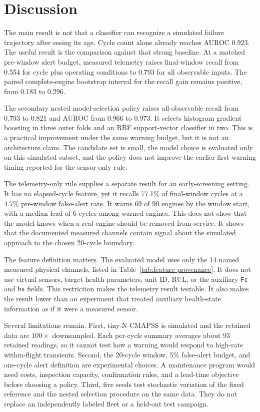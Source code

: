 \section{Discussion}
\label{sec:discussion}

The main result is not that a classifier can recognize a simulated failure
trajectory after seeing its age. Cycle count alone already reaches AUROC 0.923.
The useful result is the comparison against that strong baseline. At a matched
pre-window alert budget, measured telemetry raises final-window recall from
0.554 for cycle plus operating conditions to 0.793 for all observable inputs.
The paired complete-engine bootstrap interval for the recall gain remains
positive, from 0.183 to 0.296.

The secondary nested model-selection policy raises all-observable recall from
0.793 to 0.821 and AUROC from 0.966 to 0.973. It selects histogram gradient
boosting in three outer folds and an RBF support-vector classifier in two. This
is a practical improvement under the same warning budget, but it is not an
architecture claim. The candidate set is small, the model choice is evaluated
only on this simulated subset, and the policy does not improve the earlier
first-warning timing reported for the sensor-only rule.

The telemetry-only rule supplies a separate result for an early-screening
setting. It has no elapsed-cycle feature, yet it recalls 77.1\% of final-window
cycles at a 4.7\% pre-window false-alert rate. It warns 69 of 90 engines by
the window start, with a median lead of 6 cycles among warned engines. This
does not show that the model knows when a real engine should be removed from
service. It shows that the documented measured channels contain signal about
the simulated approach to the chosen 20-cycle boundary.

The feature definition matters. The evaluated model uses only the 14 named
measured physical channels, listed in Table~\ref{tab:feature-provenance}.
It does not use virtual sensors, target health parameters, unit ID, RUL, or the
auxiliary \texttt{Fc} and \texttt{hs} fields. This restriction makes the
telemetry result testable. It also makes the result lower than an experiment
that treated auxiliary health-state information as if it were a measured
sensor.

Several limitations remain. First, tiny-N-CMAPSS is simulated and the retained
data are $100\times$ downsampled. Each per-cycle summary averages about 93
retained readings, so it cannot test how a warning would respond to high-rate
within-flight transients. Second, the 20-cycle window, 5\% false-alert budget,
and one-cycle alert definition are experimental choices. A maintenance program
would need costs, inspection capacity, confirmation rules, and a lead-time
objective before choosing a policy. Third, five seeds test stochastic variation
of the fixed reference and the nested selection procedure on the same data.
They do not replace an independently labeled fleet or a held-out test campaign.

